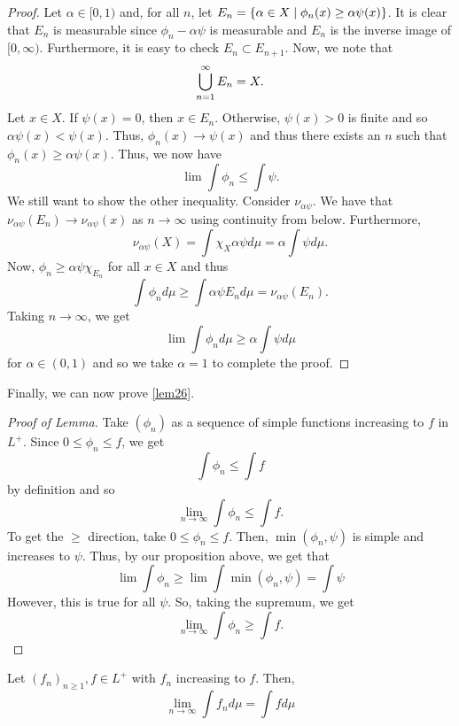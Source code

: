 \documentclass[11pt,leqno,oneside]{amsbook}
\numberwithin{thm}{section}
\begin{document}
\begin{proof}
  Let \(\alpha \in [0,1) \) and, for all \(n\), let \(E_n = \{\alpha
  \in X \mid \phi_n(x) \geq \alpha \psi(x)\}\). It is clear that
  \(E_n\) is measurable since \(\phi_n - \alpha \psi\) is measurable
  and \(E_n\) is the inverse image of \([0,\infty) \). Furthermore, it
  is easy to check \(E_n \subset E_{n+1}\). Now, we note that \[
    \bigcup_{n=1}^\infty E_n = X.
  \]
  Let \(x \in X\). If \(\psi(x) = 0\), then \(x \in E_n\). Otherwise,
  \(\psi(x) > 0\) is finite and so \(\alpha \psi(x) < \psi(x)\). Thus,
  \(\phi_n(x) \to \psi(x)\) and thus there exists an \(n\) such that
  \(\phi_n(x) \geq \alpha \psi(x)\). Thus, we now have \[
    \lim \int \phi_n \leq \int \psi.
  \]
  We still want to show the other inequality. Consider \(\nu_{\alpha
    \psi}\). We have that \(\nu_{\alpha \psi}(E_n) \to \nu_{\alpha
    \psi}(x)\) as \(n \to \infty \) using continuity from
  below. Furthermore, \[
    \nu_{\alpha \psi}(X) = \int \chi_X \alpha \psi d\mu = \alpha \int
    \psi d\mu.
  \]
  Now, \(\phi_n \geq \alpha \psi \chi_{E_n}\) for all \(x \in X\) and
  thus \[
    \int \phi_n d\mu \geq \int \alpha \psi E_n d\mu = \nu_{\alpha \psi}(E_n).
  \]
  Taking \(n \to \infty\), we get \[
    \lim \int \phi_n d\mu \geq \alpha \int \psi d\mu
  \]
  for \(\alpha \in (0,1)\) and so we take \(\alpha = 1\) to complete
  the proof.
\end{proof}
Finally, we can now prove \ref{lem26}.
\begin{proof}[Proof of Lemma]
  Take \((\phi_n)\) as a sequence of simple functions increasing to
  \(f\) in \(L^+\). Since \(0 \leq \phi_n \leq f\), we get \[
    \int \phi_n \leq \int f
  \]
  by definition and so \[
    \lim_{n \to \infty} \int \phi_n \leq \int f.
  \]
  To get the \(\geq\) direction, take \(0 \leq \phi_n \leq f\). Then,
  \(\min(\phi_n,\psi)\) is simple and increases to \(\psi\). Thus, by
  our proposition above, we get that \[
    \lim \int \phi_n \geq \lim \int \min(\phi_n,\psi) = \int \psi
  \]
  However, this is true for all \(\psi\). So, taking the supremum, we
  get \[
  \lim_{n \to \infty} \int \phi_n \geq \int f.
  \]
\end{proof}
\begin{thm}
  Let \((f_n)_{n \geq 1}, f \in L^+\) with \(f_n\) increasing to
  \(f\). Then, \[
    \lim_{n \to \infty} \int f_n d\mu = \int f d\mu
  \]
\end{thm}
\end{document}
